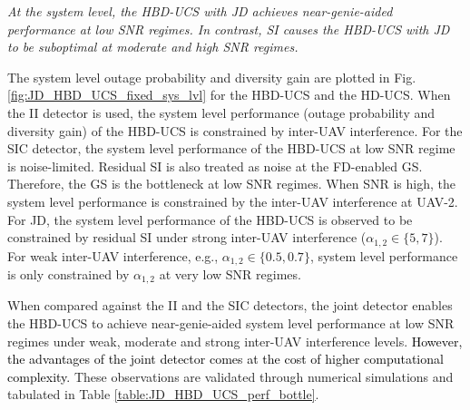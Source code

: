 

\begin{observation}
\emph{\emph{At the system level, the HBD-UCS with JD achieves near-genie-aided performance at low SNR regimes. In contrast, SI causes the HBD-UCS with JD to be suboptimal at moderate and high SNR regimes.}
}\end{observation}

The system level outage probability and diversity gain are plotted in Fig. \ref{fig:JD_HBD_UCS_fixed_sys_lvl} for the HBD-UCS and the HD-UCS. When the II detector is used, the system level performance (outage probability and diversity gain) of the HBD-UCS is constrained by inter-UAV interference. For the SIC detector, the system level performance of the HBD-UCS at low SNR regime is noise-limited. Residual SI is also treated as noise at the FD-enabled GS. Therefore, the GS is the bottleneck at low SNR regimes. When SNR is high, the system level performance is constrained by the inter-UAV interference at UAV-2. For JD, the system level performance of the HBD-UCS is observed to be constrained by residual SI under strong inter-UAV interference ($\alpha_{1,2} \in \{5,7\}$). For weak inter-UAV interference, e.g., $\alpha_{1,2} \in \{0.5,0.7\}$, system level performance is only constrained by $\alpha_{1,2}$ at very low SNR regimes. 


When compared against the II and the SIC detectors, the joint detector enables the HBD-UCS to achieve near-genie-aided system level performance at low SNR regimes under weak, moderate and strong inter-UAV interference levels. \textcolor{black}{However, the advantages of the joint detector comes at the cost of higher computational complexity.} These observations are validated through numerical simulations and tabulated in Table \ref{table:JD_HBD_UCS_perf_bottle}.

